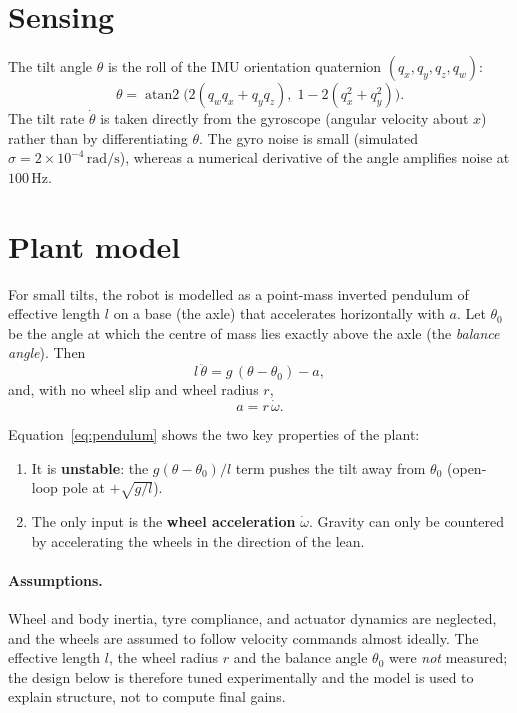 \documentclass[11pt,a4paper]{article}
\newcommand{\rads}{\,\mathrm{rad/s}}
\begin{document}
\section{Sensing}
The tilt angle $\theta$ is the roll of the IMU orientation quaternion
$(q_x,q_y,q_z,q_w)$:
\begin{equation}
  \theta = \operatorname{atan2}\!\bigl(2(q_w q_x + q_y q_z),\; 1 - 2(q_x^2+q_y^2)\bigr).
  \label{eq:roll}
\end{equation}
The tilt rate $\dot\theta$ is taken directly from the gyroscope
(angular velocity about $x$) rather than by differentiating $\theta$. The gyro
noise is small (simulated $\sigma = 2\times10^{-4}\rads$), whereas a numerical
derivative of the angle amplifies noise at $100\,\mathrm{Hz}$.

\section{Plant model}
For small tilts, the robot is modelled as a point-mass inverted pendulum of
effective length $l$ on a base (the axle) that accelerates horizontally with
$a$. Let $\theta_0$ be the angle at which the centre of mass lies exactly above
the axle (the \emph{balance angle}). Then
\begin{equation}
  l\,\ddot\theta = g\,(\theta-\theta_0) - a ,
  \label{eq:pendulum}
\end{equation}
and, with no wheel slip and wheel radius $r$,
\begin{equation}
  a = r\,\dot\omega .
  \label{eq:accel}
\end{equation}

Equation~\eqref{eq:pendulum} shows the two key properties of the plant:
\begin{enumerate}
  \item It is \textbf{unstable}: the $g(\theta-\theta_0)/l$ term pushes the tilt
        away from $\theta_0$ (open-loop pole at $+\sqrt{g/l}$).
  \item The only input is the \textbf{wheel acceleration} $\dot\omega$. Gravity can
        only be countered by accelerating the wheels in the direction of the lean.
\end{enumerate}

\paragraph{Assumptions.} Wheel and body inertia, tyre compliance, and
actuator dynamics are neglected, and the wheels are assumed to follow velocity
commands almost ideally. The effective length $l$, the wheel radius $r$ and
the balance angle $\theta_0$ were \emph{not} measured; the design below is
therefore tuned experimentally and the model is used to explain structure, not
to compute final gains.
\end{document}
